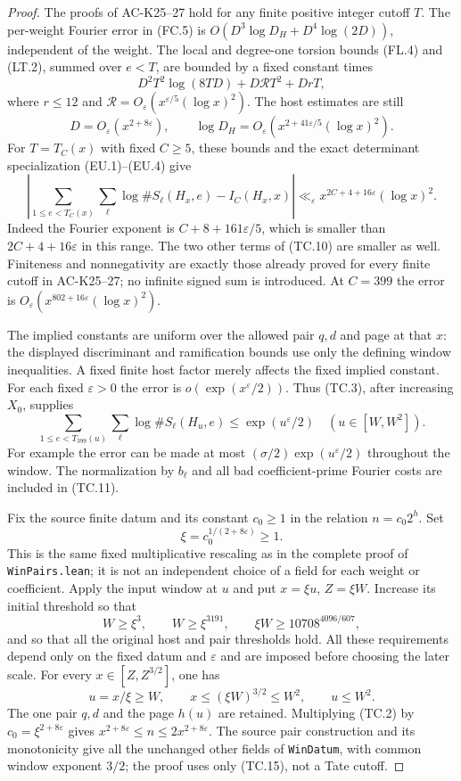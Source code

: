 \begin{proof}
The proofs of AC-K25--27 hold for any finite positive integer
cutoff $T$.  The per-weight Fourier error in (FC.5) is
$O(D^3\log D_H+D^4\log(2D))$, independent of the weight.
The local and degree-one torsion bounds (FL.4) and (LT.2),
summed over $e<T$, are bounded by a fixed constant times
\[
 D^2T^2\log(8TD)+D\mathcal R T^2+DrT,
 \tag{TC.10}
\]
where $r\leq12$ and
$\mathcal R=O_\varepsilon(x^{\varepsilon/5}(\log x)^2)$.
The host estimates are still
\[
 D=O_\varepsilon(x^{2+8\varepsilon}),\qquad
 \log D_H=O_\varepsilon(x^{2+41\varepsilon/5}(\log x)^2).
\]
For $T=T_C(x)$ with fixed $C\geq5$, these bounds and the exact
determinant specialization (EU.1)--(EU.4) give
\[
 \left|\sum_{1\leq e<T_C(x)}\sum_\ell\log\#S_\ell(H_x,e)
                       -I_C(H_x,x)\right|
 \ll_\varepsilon x^{2C+4+16\varepsilon}(\log x)^2.
 \tag{TC.11}
\]
Indeed the Fourier exponent is $C+8+161\varepsilon/5$,
which is smaller than $2C+4+16\varepsilon$ in this range.
The two other terms of (TC.10) are smaller as well.
Finiteness and nonnegativity are exactly those already proved
for every finite cutoff in AC-K25--27; no infinite signed sum
is introduced.  At $C=399$ the error is
$O_\varepsilon(x^{802+16\varepsilon}(\log x)^2)$.

The implied constants are uniform over the allowed pair $q,d$
and page at that $x$: the displayed discriminant and ramification
bounds use only the defining window inequalities.  A fixed
finite host factor merely affects the fixed implied constant.
For each fixed $\varepsilon>0$ the error is
$o(\exp(x^\varepsilon/2))$.  Thus (TC.3), after increasing
$X_0$, supplies
\[
 \sum_{1\leq e<T_{399}(u)}\sum_\ell\log\#S_\ell(H_u,e)
                  \leq\exp(u^\varepsilon/2)
                         \quad(u\in[W,W^2]).
 \tag{TC.12}
\]
For example the error can be made at most
$(\sigma/2)\exp(u^\varepsilon/2)$ throughout the window.
The normalization by $b_\ell$ and all bad coefficient-prime
Fourier costs are included in (TC.11).

Fix the source finite datum and its constant $c_0\geq1$ in
the relation $n=c_0 2^h$.  Set
\[
                  \xi=c_0^{1/(2+8\varepsilon)}\geq1.
 \tag{TC.13}
\]
This is the same fixed multiplicative rescaling as in the
complete proof of \texttt{WinPairs.lean}; it is not an
independent choice of a field for each weight or coefficient.
Apply the input window at $u$ and put $x=\xi u$, $Z=\xi W$.
Increase its initial threshold so that
\[
 W\geq\xi^3,\qquad W\geq\xi^{3191},\qquad
 \xi W\geq10708^{4096/607},
 \tag{TC.14}
\]
and so that all the original host and pair thresholds hold.
All these requirements depend only on the fixed datum and
$\varepsilon$ and are imposed before choosing the later scale.
For every $x\in[Z,Z^{3/2}]$, one has
\[
 u=x/\xi\geq W,\qquad
 x\leq(\xi W)^{3/2}\leq W^2,\qquad u\leq W^2.
 \tag{TC.15}
\]
The one pair $q,d$ and the page $h(u)$ are retained.
Multiplying (TC.2) by $c_0=\xi^{2+8\varepsilon}$ gives
$x^{2+8\varepsilon}\leq n\leq2x^{2+8\varepsilon}$.
The source pair construction and its monotonicity give all
the unchanged other fields of \texttt{WinDatum}, with common
window exponent $3/2$; the proof uses only (TC.15), not a Tate
cutoff.


\end{proof}
